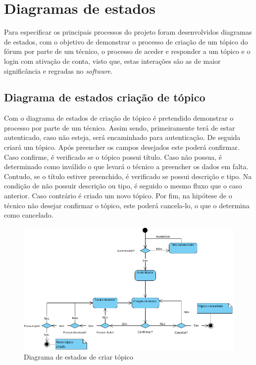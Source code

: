 \section{Diagramas de estados}
Para especificar os principais processos do projeto foram desenvolvidos diagramas de estados, com o objetivo de demonstrar o processo de criação de um tópico do fórum por parte de um técnico, o processo de aceder e responder a um tópico e o login com ativação de conta, visto que, estas interações são as de maior significância e regradas no \textit{software}.

\subsection{Diagrama de estados criação de tópico}

Com o diagrama de estados de criação de tópico é pretendido demonstrar o processo por parte de um técnico. Assim sendo, primeiramente terá de estar autenticado, caso não esteja, será encaminhado para autenticação. De seguida criará um tópico. Após preencher os campos desejados este poderá confirmar. Caso confirme, é verificado se o tópico possui título. Caso não possua, é determinado como inválido o que levará o técnico a preencher os dados em falta. Contudo, se o título estiver preenchido, é verificado se possui descrição e tipo. Na condição de não possuir descrição ou tipo, é seguido o mesmo fluxo que o caso anterior. Caso contrário é criado um novo tópico. Por fim, na hipótese de o técnico não desejar confirmar o tópico, este poderá cancela-lo, o que o determina como cancelado.

\begin{figure}[htb]
  \centering
  \includegraphics[width=\textwidth]{images/diagramas/estados/criar_topico.png}
  \caption{Diagrama de estados de criar tópico}
  \label{fig:40}
\end{figure}

